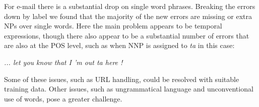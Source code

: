 For e-mail there is a substantial drop on single word phrases.  Breaking the
errors down by label we found that the majority of the new errors are missing
or extra NPs over single words.  Here the main problem appears to be temporal
expressions, though there also appear to be a substantial number of errors that
are also at the POS level, such as when NNP is assigned to \emph{ta} in this
case:

\vspace{3mm}
\emph{... let you know that I 'm out ta here !}
\vspace{3mm}

Some of these issues, such as URL handling, could be resolved with suitable
training data.  Other issues, such as ungrammatical language and
unconventional use of words, pose a greater challenge.

